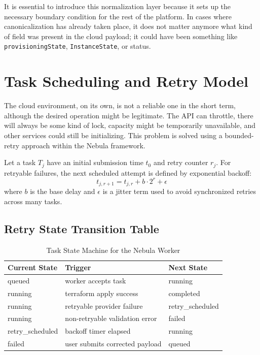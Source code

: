 It is essential to introduce this normalization layer because it sets up the necessary boundary condition for the rest of the platform. In cases where canonicalization has already taken place, it does not matter anymore what kind of field was present in the cloud payload; it could have been something like \texttt{provisioningState}, \texttt{InstanceState}, or status.

\section{Task Scheduling and Retry Model}
The cloud environment, on its own, is not a reliable one in the short term, although the desired operation might be legitimate. The API can throttle, there will always be some kind of lock, capacity might be temporarily unavailable, and other services could still be initializing. This problem is solved using a bounded-retry approach within the Nebula framework.

Let a task $T_j$ have an initial submission time $t_0$ and retry counter $r_j$. For retryable failures, the next scheduled attempt is defined by exponential backoff:
\[
t_{j,r+1} = t_{j,r} + b \cdot 2^r + \epsilon
\]
where $b$ is the base delay and $\epsilon$ is a jitter term used to avoid synchronized retries across many tasks.

\subsection{Retry State Transition Table}
\begin{table}[h]
\centering
\caption{Task State Machine for the Nebula Worker}
\label{tab:task_state_machine}
\begin{tabular}{|l|l|l|}
\hline
\textbf{Current State} & \textbf{Trigger} & \textbf{Next State} \\ \hline
queued & worker accepts task & running \\ \hline
running & terraform apply success & completed \\ \hline
running & retryable provider failure & retry\_scheduled \\ \hline
running & non-retryable validation error & failed \\ \hline
retry\_scheduled & backoff timer elapsed & running \\ \hline
failed & user submits corrected payload & queued \\ \hline
\end{tabular}
\end{table}

